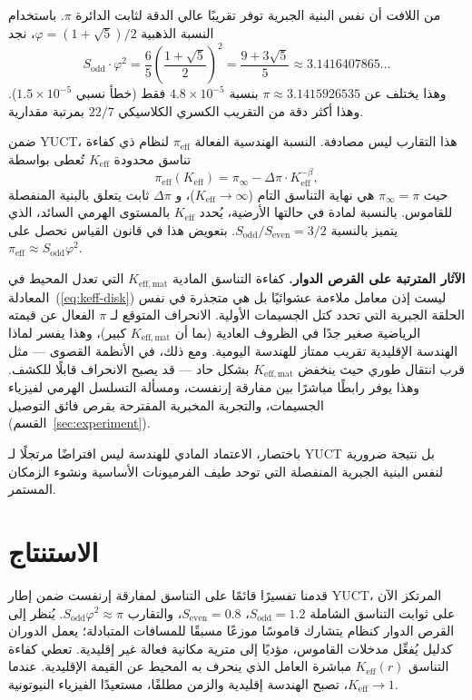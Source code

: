 \documentclass[12pt,a4paper]{article}
\newcommand{\Sodd}{S_{\mathrm{odd}}}
\newcommand{\Seven}{S_{\mathrm{even}}}
\begin{document}
	من اللافت أن نفس البنية الجبرية توفر تقريبًا عالي الدقة لثابت الدائرة \(\pi\). باستخدام النسبة الذهبية \(\varphi = (1+\sqrt{5})/2\)، نجد
	\begin{equation}
		S_{\mathrm{odd}} \cdot \varphi^2 = \frac{6}{5} \left( \frac{1+\sqrt{5}}{2} \right)^2 
		= \frac{9+3\sqrt{5}}{5} \approx 3.1416407865\dots
	\end{equation}
	وهذا يختلف عن \(\pi \approx 3.1415926535\) بنسبة \(4.8\times10^{-5}\) فقط (خطأ نسبي \(1.5\times10^{-5}\)). وهذا أكثر دقة من التقريب الكسري الكلاسيكي \(22/7\) بمرتبة مقدارية.
	
	ضمن YUCT، هذا التقارب ليس مصادفة. النسبة الهندسية الفعالة \(\pi_{\mathrm{eff}}\) لنظام ذي كفاءة تناسق محدودة \(K_{\mathrm{eff}}\) تُعطى بواسطة
	\begin{equation}
		\pi_{\mathrm{eff}}(K_{\mathrm{eff}}) = \pi_{\infty} - \Delta\pi \cdot K_{\mathrm{eff}}^{-\beta},
	\end{equation}
	حيث \(\pi_{\infty} = \pi\) هي نهاية التناسق التام (\(K_{\mathrm{eff}} \to \infty\))، و \(\Delta\pi\) ثابت يتعلق بالبنية المنفصلة للقاموس. بالنسبة لمادة في حالتها الأرضية، يُحدد \(K_{\mathrm{eff}}\) بالمستوى الهرمي السائد، الذي يتميز بالنسبة \(S_{\mathrm{odd}}/S_{\mathrm{even}} = 3/2\). بتعويض هذا في قانون القياس نحصل على \(\pi_{\mathrm{eff}} \approx S_{\mathrm{odd}}\varphi^2\).
	
	\textbf{الآثار المترتبة على القرص الدوار.}
	كفاءة التناسق المادية \(K_{\mathrm{eff,mat}}\) التي تعدل المحيط في المعادلة~(\ref{eq:keff-disk}) ليست إذن معامل ملاءمة عشوائيًا بل هي متجذرة في نفس الحلقة الجبرية التي تحدد كتل الجسيمات الأولية. الانحراف المتوقع لـ \(\pi\) الفعال عن قيمته الرياضية صغير جدًا في الظروف العادية (بما أن \(K_{\mathrm{eff,mat}}\) كبير)، وهذا يفسر لماذا الهندسة الإقليدية تقريب ممتاز للهندسة اليومية. ومع ذلك، في الأنظمة القصوى — مثل قرب انتقال طوري حيث ينخفض \(K_{\mathrm{eff,mat}}\) بشكل حاد — قد يصبح الانحراف قابلًا للكشف. وهذا يوفر رابطًا مباشرًا بين مفارقة إرنفست، ومسألة التسلسل الهرمي لفيزياء الجسيمات، والتجربة المخبرية المقترحة بقرص فائق التوصيل (القسم~\ref{sec:experiment}).
	
	باختصار، الاعتماد المادي للهندسة ليس افتراضًا مرتجلًا لـ YUCT بل نتيجة ضرورية لنفس البنية الجبرية المنفصلة التي توحد طيف الفرميونات الأساسية ونشوء الزمكان المستمر.
	
	\section{الاستنتاج}
	\label{sec:conclusion}
	
	قدمنا تفسيرًا قائمًا على التناسق لمفارقة إرنفست ضمن إطار YUCT، المرتكز الآن على ثوابت التناسق الشاملة \(\Sodd = 1.2\)، \(\Seven = 0.8\)، والتقارب \(\Sodd \varphi^2 \approx \pi\). يُنظر إلى القرص الدوار كنظام يتشارك قاموسًا موزعًا مسبقًا للمسافات المتبادلة؛ يعمل الدوران كدليل يُفعِّل مدخلات القاموس، مؤديًا إلى مترية مكانية فعالة غير إقليدية. تعطي كفاءة التناسق \(K_{\mathrm{eff}}(r)\) مباشرة العامل الذي ينحرف به المحيط عن القيمة الإقليدية. عندما \(K_{\mathrm{eff}} \to 1\)، تصبح الهندسة إقليدية والزمن مطلقًا، مستعيدًا الفيزياء النيوتونية.
	
\end{document}
